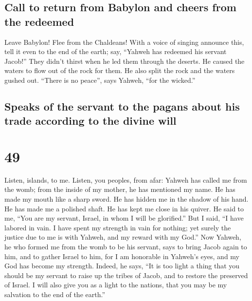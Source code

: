 \hypertarget{call-to-return-from-babylon-and-cheers-from-the-redeemed}{%
\subsection{Call to return from Babylon and cheers from the
redeemed}\label{call-to-return-from-babylon-and-cheers-from-the-redeemed}}

 Leave Babylon! Flee from the Chaldeans! With a voice of
singing announce this, tell it even to the end of the earth; say,
``Yahweh has redeemed his servant Jacob!''  They didn't
thirst when he led them through the deserts. He caused the waters to
flow out of the rock for them. He also split the rock and the waters
gushed out.  ``There is no peace'', says Yahweh, ``for
the wicked.''

\hypertarget{speaks-of-the-servant-to-the-pagans-about-his-trade-according-to-the-divine-will}{%
\subsection{Speaks of the servant to the pagans about his trade
according to the divine
will}\label{speaks-of-the-servant-to-the-pagans-about-his-trade-according-to-the-divine-will}}

\hypertarget{section-48}{%
\section{49}\label{section-48}}

 Listen, islands, to me. Listen, you peoples, from afar:
Yahweh has called me from the womb; from the inside of my mother, he has
mentioned my name.  He has made my mouth like a sharp
sword. He has hidden me in the shadow of his hand. He has made me a
polished shaft. He has kept me close in his quiver.  He
said to me, ``You are my servant, Israel, in whom I will be glorified.''
 But I said, ``I have labored in vain. I have spent my
strength in vain for nothing; yet surely the justice due to me is with
Yahweh, and my reward with my God.''  Now Yahweh, he who
formed me from the womb to be his servant, says to bring Jacob again to
him, and to gather Israel to him, for I am honorable in Yahweh's eyes,
and my God has become my strength.  Indeed, he says, ``It
is too light a thing that you should be my servant to raise up the
tribes of Jacob, and to restore the preserved of Israel. I will also
give you as a light to the nations, that you may be my salvation to the
end of the earth.''

